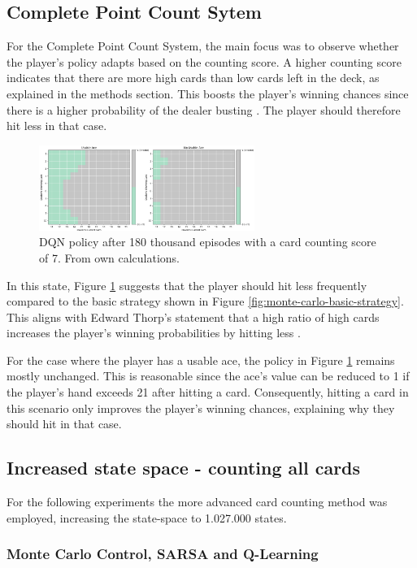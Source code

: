 \documentclass[conference]{IEEEtran}
\begin{document}
\subsection{Complete Point Count Sytem}
For the Complete Point Count System, the main focus was to observe whether the player's policy adapts based on the counting score. A higher counting score indicates that there are more high cards than low cards left in the deck, as explained in the methods section. This boosts the player's winning chances since there is a higher probability of the dealer busting \cite{b1}. The player should therefore hit less in that case.

\begin{figure}
	\centering
	\includegraphics[width=70mm]{figures/DQN/counting-180000/policy-counting-7.png}
	\caption{DQN policy after 180 thousand episodes with a card counting score of 7. From own calculations.}
	\label{fig:dqn-card-counting-7}
\end{figure}

In this state, Figure \ref{fig:dqn-card-counting-7} suggests that the player should hit less frequently compared to the basic strategy shown in Figure \ref{fig:monte-carlo-basic-strategy}. This aligns with Edward Thorp's statement that a high ratio of high cards increases the player's winning probabilities by hitting less \cite{b1}.

For the case where the player has a usable ace, the policy in Figure \ref{fig:dqn-card-counting-7} remains mostly unchanged. This is reasonable since the ace's value can be reduced to 1 if the player's hand exceeds 21 after hitting a card. Consequently, hitting a card in this scenario only improves the player's winning chances, explaining why they should hit in that case.


\subsection{Increased state space - counting all cards}
For the following experiments the more advanced card counting method was employed, increasing the state-space to 1.027.000 states. 

\subsubsection{Monte Carlo Control, SARSA and Q-Learning}
\end{document}
